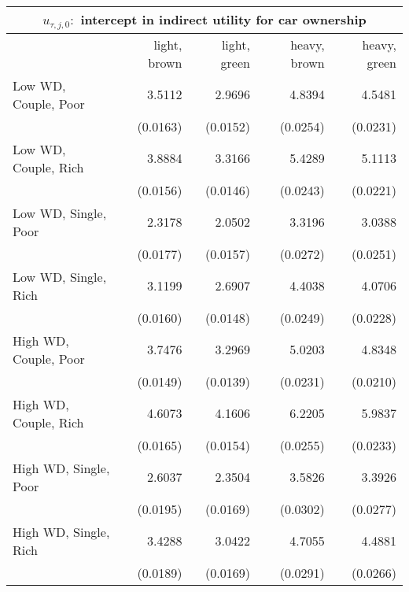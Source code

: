 \begin{tabular}{lrrrr} 
\toprule 
\multicolumn{5}{c}{$u_{\tau,j,0} : $ intercept in indirect utility for car ownership} \\ 
\midrule
                                & light, brown   & light, green   & heavy, brown   & heavy, green  \\ 
\midrule 
          Low WD, Couple, Poor  &       3.5112   &       2.9696   &       4.8394   &       4.5481  \\ 
                                & (0.0163)   & (0.0152)   & (0.0254)   & (0.0231)  \\ 
          Low WD, Couple, Rich  &       3.8884   &       3.3166   &       5.4289   &       5.1113  \\ 
                                & (0.0156)   & (0.0146)   & (0.0243)   & (0.0221)  \\ 
          Low WD, Single, Poor  &       2.3178   &       2.0502   &       3.3196   &       3.0388  \\ 
                                & (0.0177)   & (0.0157)   & (0.0272)   & (0.0251)  \\ 
          Low WD, Single, Rich  &       3.1199   &       2.6907   &       4.4038   &       4.0706  \\ 
                                & (0.0160)   & (0.0148)   & (0.0249)   & (0.0228)  \\ 
         High WD, Couple, Poor  &       3.7476   &       3.2969   &       5.0203   &       4.8348  \\ 
                                & (0.0149)   & (0.0139)   & (0.0231)   & (0.0210)  \\ 
         High WD, Couple, Rich  &       4.6073   &       4.1606   &       6.2205   &       5.9837  \\ 
                                & (0.0165)   & (0.0154)   & (0.0255)   & (0.0233)  \\ 
         High WD, Single, Poor  &       2.6037   &       2.3504   &       3.5826   &       3.3926  \\ 
                                & (0.0195)   & (0.0169)   & (0.0302)   & (0.0277)  \\ 
         High WD, Single, Rich  &       3.4288   &       3.0422   &       4.7055   &       4.4881  \\ 
                                & (0.0189)   & (0.0169)   & (0.0291)   & (0.0266)  \\ 
\bottomrule \end{tabular} 
